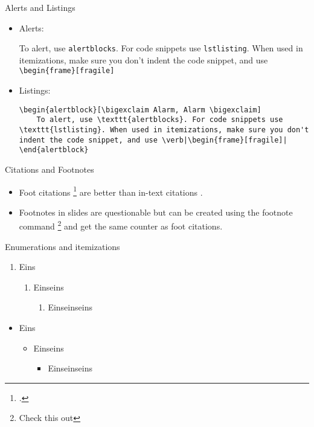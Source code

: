 \documentclass{beamer}
\begin{document}
\begin{frame}[fragile]{Alerts and Listings}
\begin{itemize}
	\item Alerts:
	\begin{alertblock}
		To alert, use \texttt{alertblocks}. For code snippets use \texttt{lstlisting}. When used in itemizations, make sure you don't indent the code snippet, and use \verb|\begin{frame}[fragile]|
	\end{alertblock}
\item Listings:
	\begin{lstlisting}
\begin{alertblock}[\bigexclaim Alarm, Alarm \bigexclaim]
	To alert, use \texttt{alertblocks}. For code snippets use \texttt{lstlisting}. When used in itemizations, make sure you don't indent the code snippet, and use \verb|\begin{frame}[fragile]|
\end{alertblock}
	\end{lstlisting}
\end{itemize}
\end{frame}

\begin{frame}{Citations and Footnotes}
\begin{itemize}
	\item Foot citations \footcite{AdamsFournier2003} are better than in-text citations \citep{AlexanderianPetraStadlerEtAl2016}.

	\item Footnotes in slides are questionable but can be created using the footnote command \footnote{Check this out} and get the same counter as foot citations.
\end{itemize}
\end{frame}

\begin{frame}{Enumerations and itemizations}
\begin{enumerate}
	\item Eins
	\begin{enumerate}
		\item Einseins
		\begin{enumerate}
			\item Einseinseins
		\end{enumerate}
	\end{enumerate}
\end{enumerate}
\begin{itemize}
	\item Eins
	\begin{itemize}
		\item Einseins
		\begin{itemize}
			\item Einseinseins
		\end{itemize}
	\end{itemize}
\end{itemize}
\end{frame}
	
\end{document}
